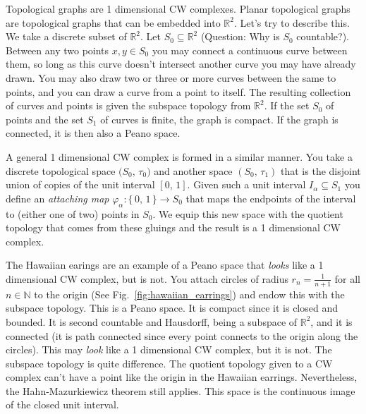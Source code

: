 \documentclass{article}
\theoremstyle{plain}
\theoremstyle{normal}
\newenvironment{example}{%
    \pushQED{\qed}\renewcommand{\qedsymbol}{$\blacksquare$}\examplex%
}{%
    \popQED\endexamplex%
}
\begin{document}
        \begin{example}
            Topological graphs are 1 dimensional CW complexes. Planar
            topological graphs are topological graphs that can be embedded into
            $\mathbb{R}^{2}$. Let's try to describe this. We take a discrete
            subset of $\mathbb{R}^{2}$. Let $S_{0}\subseteq\mathbb{R}^{2}$
            (Question: Why is $S_{0}$ countable?). Between any two points
            $x,y\in{S}_{0}$ you may connect a continuous curve between them,
            so long as this curve doesn't intersect another curve you may have
            already drawn. You may also draw two or three or more curves between
            the same to points, and you can draw a curve from a point to itself.
            The resulting collection of curves and points is given the subspace
            topology from $\mathbb{R}^{2}$. If the set $S_{0}$ of points and the
            set $S_{1}$ of curves is finite, the graph is compact. If the graph
            is connected, it is then also a Peano space.
            \par\hfill\par
            A general 1 dimensional CW complex is formed in a similar manner.
            You take a discrete topological space
            $\big(S_{0},\,\tau_{0}\big)$ and another space
            $(S_{0},\,\tau_{1})$ that is the disjoint union of copies of the
            unit interval $[0,\,1]$. Given such a unit interval
            $I_{\alpha}\subseteq{S}_{1}$ you define an \textit{attaching map}
            $\varphi_{\alpha}:\{\,0,\,1\,\}\rightarrow{S}_{0}$ that maps the
            endpoints of the interval to (either one of two) points in $S_{0}$.
            We equip this new space with the quotient topology that comes from
            these gluings and the result is a 1 dimensional CW complex.
        \end{example}
        \begin{example}
            The Hawaiian earings are an example of a Peano space that
            \textit{looks} like a 1 dimensional CW complex, but is not.
            You attach circles of radius $r_{n}=\frac{1}{n+1}$ for all
            $n\in\mathbb{N}$ to the origin
            (See Fig.~\ref{fig:hawaiian_earrings}) and endow this with the
            subspace topology. This is a Peano space. It is compact since it is
            closed and bounded. It is second countable and Hausdorff, being a
            subspace of $\mathbb{R}^{2}$, and it is connected (it is path
            connected since every point connects to the origin along the
            circles). This may \textit{look} like a 1 dimensional CW complex,
            but it is not. The subspace topology is quite difference. The
            quotient topology given to a CW complex can't have a point like
            the origin in the Hawaiian earrings. Nevertheless, the
            Hahn-Mazurkiewicz theorem still applies. This space is the
            continuous image of the closed unit interval.
        \end{example}
\end{document}
